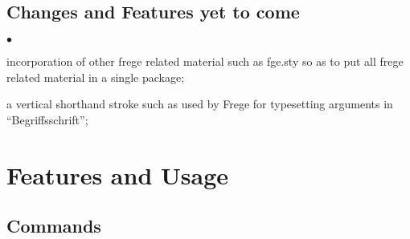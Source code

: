 \documentclass[12pt]{article}
\newcommand{\squishlist}{
  \begin{list}{$\bullet$}{
    \setlength{\itemsep}{0pt}
    \setlength{\parsep}{0pt}
    \setlength{\topsep}{0pt}
    \setlength{\partopsep}{0pt}
    \setlength{\leftmargin}{1em}
    \setlength{\labelwidth}{1em}
    \setlength{\parskip}{0pt}
    \setlength{\partopsep}{0pt}
    \setlength{\rightmargin}{0pt}
    \setlength{\labelsep}{0.5em}}}
\newcommand{\squishlistend}{\end{list}}
\begin{document}
\subsection{Changes and Features yet to come}
  \squishlist
    \item incorporation of other frege related material such as fge.sty so as to put 
      all frege related material in a single package;
    \item a vertical shorthand stroke such as used by Frege for typesetting arguments 
      in ``Begriffsschrift'';
  \squishlistend

\section{Features and Usage}
\subsection{Commands}
\end{document}
